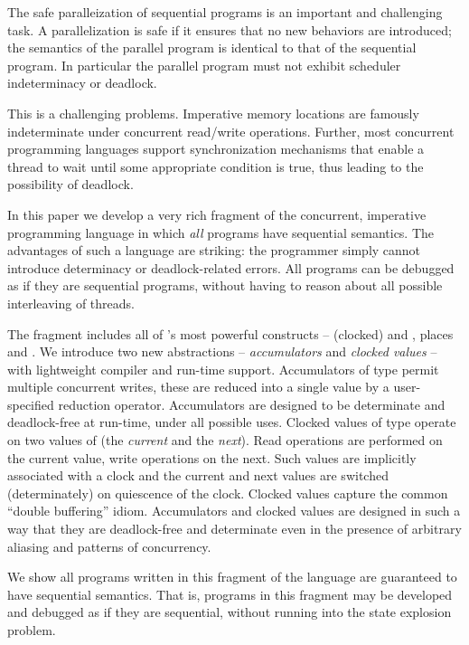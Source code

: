 
The safe paralleization of sequential programs is an important and
challenging task. A parallelization is safe if it ensures that no new
behaviors are introduced; the semantics of the parallel program is
identical to that of the sequential program. In particular the
parallel program must not exhibit scheduler indeterminacy or deadlock.

This is a challenging problems.  Imperative memory locations are
famously indeterminate under concurrent read/write
operations. Further, most concurrent programming languages support
synchronization mechanisms that enable a thread to wait until some
appropriate condition is true, thus leading to the possibility of
deadlock.

In this paper we develop a very rich fragment of the concurrent,
imperative programming language \Xten{} in which {\em all} programs
have sequential semantics. The advantages of such a language are
striking: the programmer simply cannot introduce determinacy or
deadlock-related errors. All programs can be debugged as if they are
sequential programs, without having to reason about all possible
interleaving of threads. 

The fragment includes all of \Xten{}'s most powerful constructs --
(clocked)  and , places and {}. We
introduce two new abstractions -- {\em accumulators} and {\em clocked
  values} -- with lightweight compiler and run-time
support. Accumulators of type  permit multiple concurrent
writes, these are reduced into a single value by a user-specified
reduction operator. Accumulators are designed to be determinate and
deadlock-free at run-time, under all possible uses.  Clocked values of
type  operate on two values of  (the {\em current} and
the {\em next}). Read operations are performed on the current value,
write operations on the next. Such values are implicitly associated
with a clock and the current and next values are switched
(determinately) on quiescence of the clock. Clocked values capture the
common ``double buffering'' idiom. Accumulators and clocked values are
designed in such a way that they are deadlock-free and determinate
even in the presence of arbitrary aliasing and patterns of
concurrency.

We show all programs written in this fragment of the language are
guaranteed to have sequential semantics. That is, programs in this
fragment may be developed and debugged as if they are sequential,
without running into the state explosion problem. 

